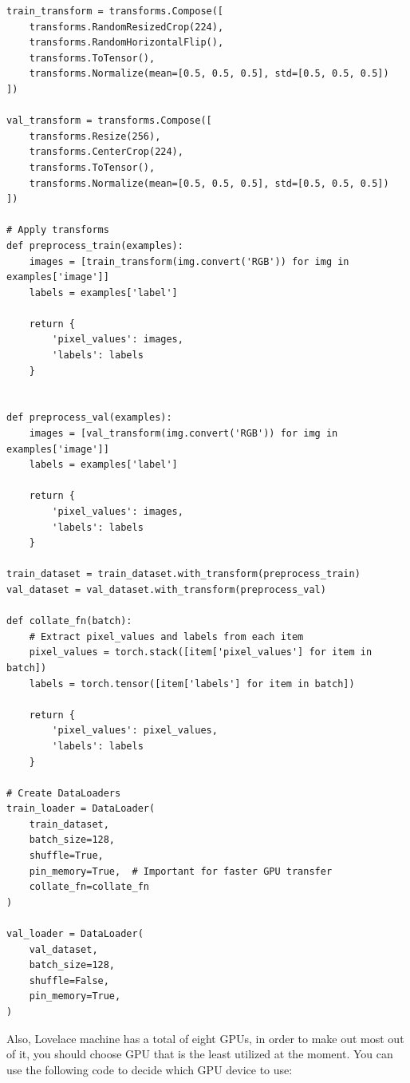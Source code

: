 \documentclass[12pt, xcolor=dvipsnames,svgnames,x11names]{article}
\begin{document}
\begin{verbatim}
train_transform = transforms.Compose([
    transforms.RandomResizedCrop(224),
    transforms.RandomHorizontalFlip(),
    transforms.ToTensor(),
    transforms.Normalize(mean=[0.5, 0.5, 0.5], std=[0.5, 0.5, 0.5])
])

val_transform = transforms.Compose([
    transforms.Resize(256),
    transforms.CenterCrop(224),
    transforms.ToTensor(),
    transforms.Normalize(mean=[0.5, 0.5, 0.5], std=[0.5, 0.5, 0.5])
])

# Apply transforms
def preprocess_train(examples):
    images = [train_transform(img.convert('RGB')) for img in examples['image']]
    labels = examples['label']
    
    return {
        'pixel_values': images,
        'labels': labels
    }


def preprocess_val(examples):
    images = [val_transform(img.convert('RGB')) for img in examples['image']]
    labels = examples['label']
    
    return {
        'pixel_values': images,
        'labels': labels
    }

train_dataset = train_dataset.with_transform(preprocess_train)
val_dataset = val_dataset.with_transform(preprocess_val)

def collate_fn(batch):
    # Extract pixel_values and labels from each item
    pixel_values = torch.stack([item['pixel_values'] for item in batch])
    labels = torch.tensor([item['labels'] for item in batch])
    
    return {
        'pixel_values': pixel_values,
        'labels': labels
    }

# Create DataLoaders
train_loader = DataLoader(
    train_dataset,
    batch_size=128,
    shuffle=True,
    pin_memory=True,  # Important for faster GPU transfer
    collate_fn=collate_fn
)

val_loader = DataLoader(
    val_dataset,
    batch_size=128,
    shuffle=False,
    pin_memory=True,
)
\end{verbatim}


Also, Lovelace machine has a total of eight GPUs, in order to make out most out of it, you should choose GPU that is the least utilized at the moment. You can use the following code to decide which GPU device to use:
\end{document}
